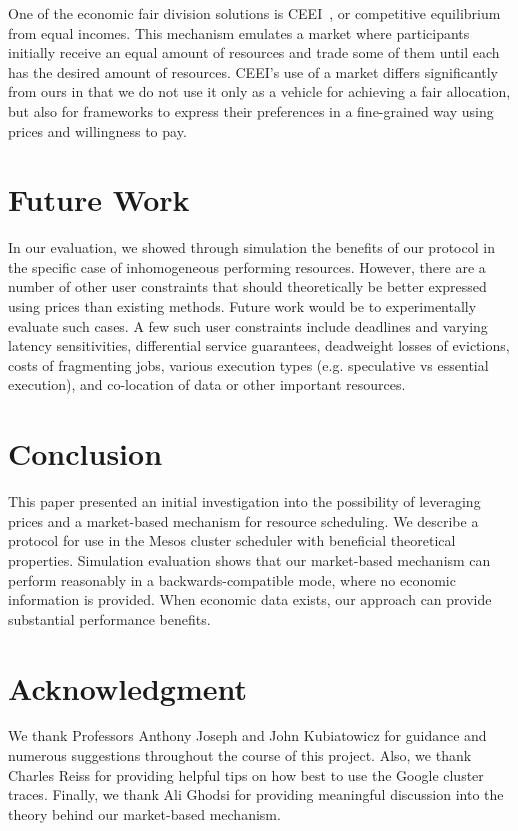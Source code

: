 \documentclass{acm_proc_article-sp}
\begin{document}
One of the economic fair division solutions is CEEI~\cite{moulin2004fair}, or
competitive equilibrium from equal incomes. This mechanism emulates a market
where participants initially receive an equal amount of resources and trade some
of them until each has the desired amount of resources. CEEI's use of a market
differs significantly from ours in that we do not use it only as a vehicle for
achieving a fair allocation, but also for frameworks to express their
preferences in a fine-grained way using prices and willingness to pay.

\section{Future Work}
\label{sec:future}

In our evaluation, we showed through simulation the benefits of our protocol in the specific case of inhomogeneous performing resources. However, there are a number of other user constraints that should theoretically be better expressed using prices than existing methods. Future work would be to experimentally evaluate such cases. A few such user constraints include deadlines and varying latency sensitivities, differential service guarantees, deadweight losses of evictions, costs of fragmenting jobs, various execution types (e.g. speculative vs essential execution), and co-location of data or other important resources.

\section{Conclusion}
\label{sec:conclusion}

This paper presented an initial investigation into the possibility of leveraging prices and a market-based mechanism for resource scheduling. We describe a protocol for use in the Mesos cluster scheduler with beneficial theoretical properties. Simulation evaluation shows that our market-based mechanism can perform reasonably in a backwards-compatible mode, where no economic information is provided. When economic data exists, our approach can provide substantial performance benefits.

\section{Acknowledgment}

We thank Professors Anthony Joseph and John Kubiatowicz for guidance and numerous suggestions throughout the course of this project. Also, we thank Charles Reiss for providing helpful tips on how best to use the Google cluster traces. Finally, we thank Ali Ghodsi for providing meaningful discussion into the theory behind our market-based mechanism.
\end{document}
